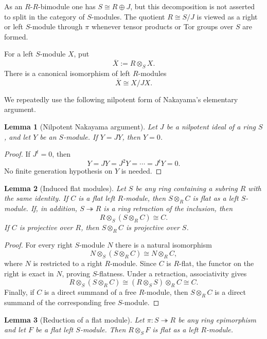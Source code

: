 \documentclass[11pt,reqno]{amsart}
\theoremstyle{plain}
\newtheorem{lemma}[lemma]{Lemma}
\theoremstyle{definition}
\theoremstyle{remark}
\begin{document}
As an $R$-$R$-bimodule one has $S\cong R\oplus J$, but this decomposition is not
asserted to split in the category of $S$-modules.  The quotient $R\cong S/J$ is
viewed as a right or left $S$-module through $\pi$ whenever tensor products or Tor
groups over $S$ are formed.

For a left $S$-module $X$, put
\[
   \overline X:=R\otimes_SX.
\]
There is a canonical isomorphism of left $R$-modules
\begin{equation}\label{eq:quotient}
   \overline X\cong X/JX.
\end{equation}

We repeatedly use the following nilpotent form of Nakayama's elementary argument.

\begin{lemma}[Nilpotent Nakayama argument]\label{lem:nil-nakayama}
Let $J$ be a nilpotent ideal of a ring $S$, and let $Y$ be an $S$-module.  If
$Y=JY$, then $Y=0$.
\end{lemma}

\begin{proof}
If $J^t=0$, then
\[
  Y=JY=J^2Y=\cdots=J^tY=0.
\]
No finite generation hypothesis on $Y$ is needed.
\end{proof}

\begin{lemma}[Induced flat modules]\label{lem:induced-flat}
Let $S$ be any ring containing a subring $R$ with the same identity.  If $C$ is a
flat left $R$-module, then $S\otimes_RC$ is flat as a left $S$-module.
If, in addition, $S\twoheadrightarrow R$ is a ring retraction of the inclusion,
then
\[
   R\otimes_S(S\otimes_RC)\cong C.
\]
If $C$ is projective over $R$, then $S\otimes_RC$ is projective over $S$.
\end{lemma}

\begin{proof}
For every right $S$-module $N$ there is a natural isomorphism
\[
 N\otimes_S(S\otimes_RC)\cong N\otimes_RC,
\]
where $N$ is restricted to a right $R$-module.  Since $C$ is $R$-flat, the functor
on the right is exact in $N$, proving $S$-flatness.  Under a retraction,
associativity gives
\[
 R\otimes_S(S\otimes_RC)
 \cong (R\otimes_SS)\otimes_RC
 \cong C.
\]
Finally, if $C$ is a direct summand of a free $R$-module, then $S\otimes_RC$ is a
direct summand of the corresponding free $S$-module.
\end{proof}

\begin{lemma}[Reduction of a flat module]\label{lem:reduction-flat}
Let $\pi:S\twoheadrightarrow R$ be any ring epimorphism and let $F$ be a flat left
$S$-module.  Then $R\otimes_SF$ is flat as a left $R$-module.
\end{lemma}
\end{document}
